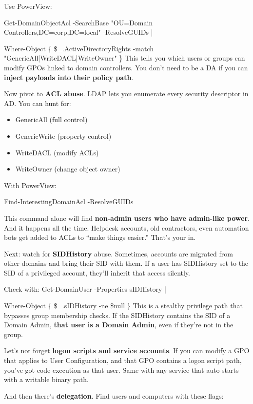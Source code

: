 Use PowerView:

Get-DomainObjectAcl -SearchBase "OU=Domain Controllers,DC=corp,DC=local" -ResolveGUIDs |

Where-Object \{ \$\_.ActiveDirectoryRights -match "GenericAll|WriteDACL|WriteOwner" \}
This tells you which users or groups can modify GPOs linked to domain controllers. You don’t need to be a DA if you can \textbf{inject payloads into their policy path}.

Now pivot to \textbf{ACL abuse}. LDAP lets you enumerate every security descriptor in AD. You can hunt for:

\begin{itemize}
    \item GenericAll (full control)

    \item GenericWrite (property control)

    \item WriteDACL (modify ACLs)

    \item WriteOwner (change object owner)

\end{itemize}
With PowerView:

Find-InterestingDomainAcl -ResolveGUIDs

This command alone will find \textbf{non-admin users who have admin-like power}. And it happens all the time. Helpdesk accounts, old contractors, even automation bots get added to ACLs to “make things easier.” That’s your in.

Next: watch for \textbf{SIDHistory} abuse. Sometimes, accounts are migrated from other domains and bring their SID with them. If a user has SIDHistory set to the SID of a privileged account, they’ll inherit that access silently.

Check with:
Get-DomainUser -Properties sIDHistory |

Where-Object \{ \$\_.sIDHistory -ne \$null \}
This is a stealthy privilege path that bypasses group membership checks. If the SIDHistory contains the SID of a Domain Admin, \textbf{that user is a Domain Admin}, even if they’re not in the group.

Let’s not forget \textbf{logon scripts and service accounts}. If you can modify a GPO that applies to User Configuration, and that GPO contains a logon script path, you’ve got code execution as that user. Same with any service that auto-starts with a writable binary path.

And then there’s \textbf{delegation}. Find users and computers with these flags:

